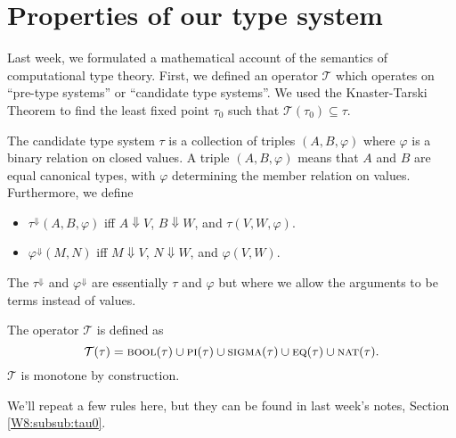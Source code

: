 \documentclass{article} \usepackage{chtt-notes} \usepackage{stmaryrd}
\newcommand{\T}{\mathcal{T}}
\begin{document}
\maketitle
\section{Properties of our type system}
%

Last week, we formulated a mathematical account of the semantics of computational
type theory. First, we defined an operator $\T$ which operates on ``pre-type systems''
or ``candidate type systems''. 
We used the Knaster-Tarski Theorem to find the least fixed point $\tau_0$ such that
$\T(\tau_0) \subseteq \tau$.

The candidate type system $\tau$ is a collection of triples $(A, B, \varphi)$ where
$\varphi$ is a binary relation on closed values. A triple $(A, B, \varphi)$ means that
$A$ and $B$ are equal canonical types, with $\varphi$ determining the member relation
on values. Furthermore, we define
\begin{itemize}
  \item $\tau^\Downarrow(A,B,\varphi)$ iff $A \Downarrow V$, $B \Downarrow W$, and $\tau(V, W, \varphi)$.
  \item $\varphi^\Downarrow(M,N)$ iff $M \Downarrow V$, $N \Downarrow W$, and $\varphi(V,W)$.
\end{itemize}
The $\tau^\Downarrow$ and $\varphi^\Downarrow$ are essentially $\tau$ and $\varphi$ but where
we allow the arguments to be terms instead of values.

The operator $\T$ is defined as
\[
  \T(\tau) = \textsc{bool}(\tau) \cup \textsc{pi}(\tau) \cup \textsc{sigma}(\tau) \cup
      \textsc{eq}(\tau) \cup \textsc{nat}(\tau).
\]
$\T$ is monotone by construction. 

We'll repeat a few rules here, but they can be found in last week's notes, Section \ref{W8:subsub:tau0}.
\end{document}
